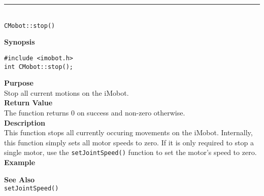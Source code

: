 \noindent
\vspace{5pt}
\rule{4.5in}{0.015in}\\
\noindent
{\LARGE \texttt{CMobot::stop()}}\\
{}

\noindent
{\bf Synopsis}\\
\begin{verbatim}
#include <imobot.h>
int CMobot::stop();
\end{verbatim}

\noindent
{\bf Purpose}\\
Stop all current motions on the iMobot.\\

\noindent
{\bf Return Value}\\
The function returns 0 on success and non-zero otherwise.\\

\noindent
{\bf Description}\\
This function stops all currently occuring movements on the iMobot. Internally, this function simply sets all motor speeds to zero. If it is only required to stop a single motor, use the 
\texttt{setJointSpeed()} function to set the motor's speed to zero. \\

\noindent
{\bf Example}\\
\noindent

\noindent
{\bf See Also}\\
\texttt{setJointSpeed()}

